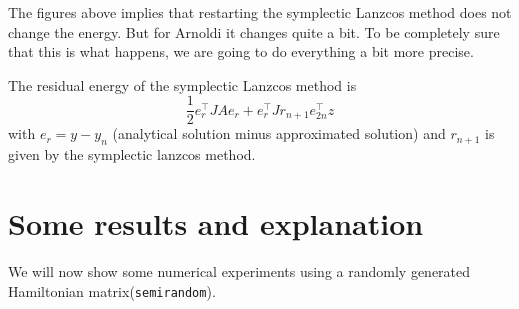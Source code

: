 The figures above implies that restarting the symplectic Lanzcos method does not change the energy. But for Arnoldi it changes quite a bit.
To be completely sure that this is what happens, we are going to do everything a bit more precise.

The residual energy of the symplectic Lanzcos method is
$$ \frac{1}{2} e_r^{\top} J A e_r + e_r^\top J r_{n+1} e_{2n}^\top z $$
with $ e_r = y-y_n $ (analytical solution minus approximated solution) and $r_{n+1}$ is given by the symplectic lanzcos method. 






\chapter{Some results and explanation}
We will now show some numerical experiments using a randomly generated Hamiltonian matrix(\texttt{semirandom}).
